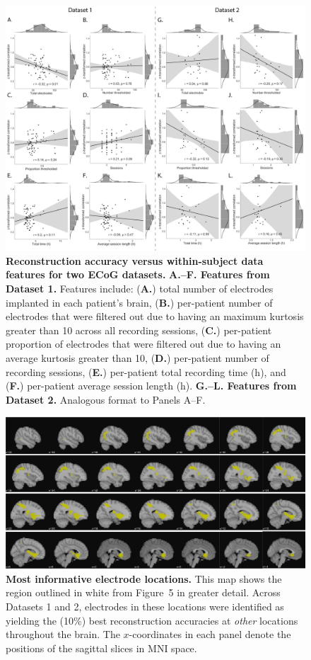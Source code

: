 \documentclass[10pt]{article}
\begin{document}
\begin{figure}[p]
\centering
\includegraphics[width=\textwidth]{figs/supplemental_4}
\caption{\textbf{Reconstruction accuracy versus within-subject data
    features for two ECoG datasets.} \textbf{A.--F.  Features from
    Dataset 1.}  Features include: (\textbf{A.}) total number of
  electrodes implanted in each patient's brain, (\textbf{B.})
  per-patient number of electrodes that were filtered out due to
  having an maximum kurtosis greater than 10 across all recording
  sessions, (\textbf{C.})  per-patient proportion of electrodes that
  were filtered out due to having an average kurtosis greater than 10,
  (\textbf{D.})  per-patient number of recording sessions,
  (\textbf{E.}) per-patient total recording time (h), and
  (\textbf{F.}) per-patient average session length (h).
  \textbf{G.--L. Features from Dataset 2.}  Analogous format to Panels
  A--F.}
\label{fig:supplemental_4}
\end{figure}


\begin{figure}[ptb]
\centering
\includegraphics[width=\textwidth]{figs/supplemental_5}
\caption{\textbf{Most informative electrode locations.}  This map
  shows the region outlined in white from Figure~5 in greater detail.
  Across Datasets 1 and 2, electrodes in these locations were
  identified as yielding the (10\%) best reconstruction accuracies at
  \textit{other} locations throughout the brain.  The $x$-coordinates
  in each panel denote the positions of the sagittal slices in MNI space.}
\label{fig:supplemental_5}
\end{figure}


% 
\end{document}
